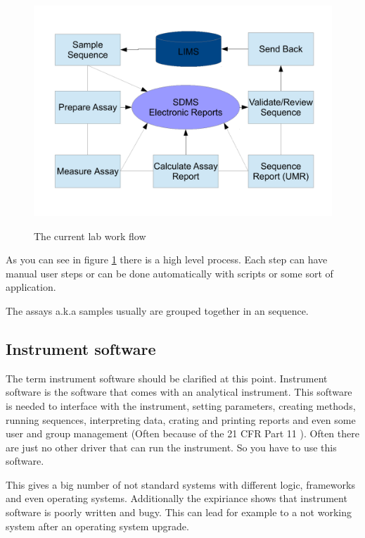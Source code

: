 \documentclass[paper=a4,twoside=false,BCOR=0mm,DIV=calc,fontsize=12pt]{scrartcl}
\begin{document}
\begin{figure}
    \begin{center}
      \includegraphics[width=1\textwidth]{./img/Laboverview.pdf}\\
    \end{center}
  \caption{The current lab work flow}
  \label{CurrentLabWorkflow}
\end{figure} 

As you can see in figure \ref{CurrentLabWorkflow} there is a high level process. Each step can have manual user steps or can be done automatically with scripts or some sort of application. 

The assays a.k.a samples usually are grouped together in an sequence.

\subsection{Instrument software}
The term instrument software should be clarified at this point. Instrument software is the software that comes with an analytical instrument. This software is needed to interface with the instrument, setting parameters, creating methods, running sequences, interpreting data, crating and printing reports and even some user and group management (Often because of the 21 CFR Part 11 \cite{part11}). Often there are just no other driver that can run the instrument. So you have to use this software. 

This gives a big number of not standard systems with different logic, frameworks and even operating systems. Additionally the expiriance shows that instrument software is poorly written and bugy. This can lead for example to a not working system after an operating system upgrade.
\end{document}
